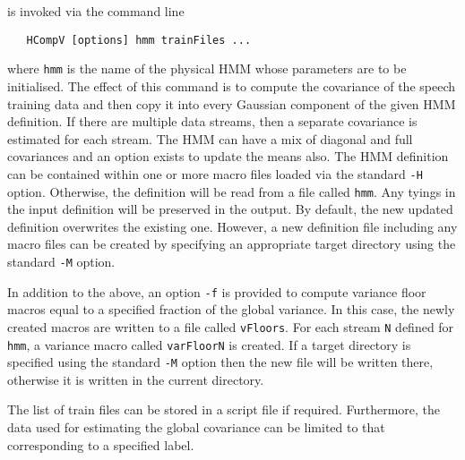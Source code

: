 is invoked via the command line
\begin{verbatim}
   HCompV [options] hmm trainFiles ...
\end{verbatim}
where \texttt{hmm} is the name of the physical HMM whose
parameters are to be initialised.  The effect of this command
is to compute the covariance of the speech
training data and then copy it into every Gaussian component of the given
HMM definition.  If there are multiple data streams, then a separate
covariance is estimated for each stream.  The HMM can have a mix of
diagonal and full covariances and an option exists to update the means
also.  The HMM definition can be contained within one or more macro
files loaded via the standard \texttt{-H} option.  Otherwise, the 
definition will be read from a file called \texttt{hmm}.  Any tyings
in the input definition will be preserved in the output. By default,
the new updated definition overwrites the existing one.  However,
a new definition file including any macro files can be created by
specifying an appropriate target directory 
using the standard \texttt{-M} option.  

In addition to the above, an option \texttt{-f} is provided to compute
variance floor macros equal to a specified fraction
of the global variance.  In this case, the newly created macros are
written to a file called \texttt{vFloors}.  
For each stream \texttt{N} defined for \texttt{hmm},  a variance macro 
called \texttt{varFloorN} is created.
If a target directory is specified
using the standard \texttt{-M} option then the new file will be written
there, otherwise it is written in the current directory.

The list of train files can be stored in a script file if required.
Furthermore, the data used for estimating the global
covariance can be limited to that corresponding to a specified label.

